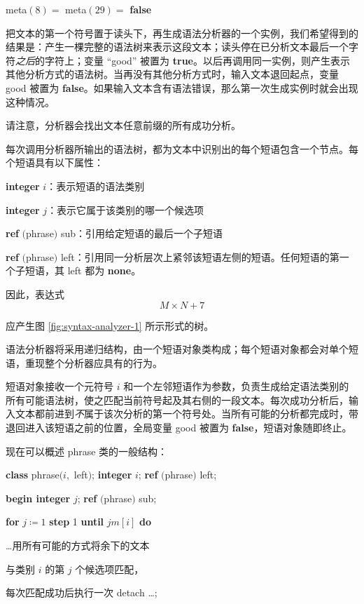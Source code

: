 \quad meta$(8) =$ meta$(29) =$ \textbf{false}

把文本的第一个符号置于读头下，再生成语法分析器的一个实例，我们希望得到的结果是：产生一棵完整的语法树来表示这段文本；读头停在已分析文本最后一个字符\textit{之后}的字符上；变量 ``good'' 被置为 \textbf{true}。以后再调用同一实例，则产生表示其他分析方式的语法树。当再没有其他分析方式时，输入文本退回起点，变量 good 被置为 \textbf{false}。如果输入文本含有语法错误，那么第一次生成实例时就会出现这种情况。

请注意，分析器会找出文本任意前缀的所有成功分析。

每次调用分析器所输出的语法树，都为文本中识别出的每个短语包含一个节点。每个短语具有以下属性：

\quad \textbf{integer} $i$：表示短语的语法类别

\quad \textbf{integer} $j$：表示它属于该类别的哪一个候选项

\quad \textbf{ref} $($phrase$)$ sub：引用给定短语的最后一个子短语

\parindent\quad \textbf{ref} $($phrase$)$ left：引用同一分析层次上紧邻该短语左侧的短语。任何短语的第一个子短语，其 left 都为 \textbf{none}。

\noindent
因此，表达式
$$
M\times N + 7
$$

\noindent
应产生图 \ref{fig:syntax-analyzer-1} 所示形式的树。

语法分析器将采用递归结构，由一个短语对象类构成；每个短语对象都会对单个短语，重现整个分析器应具有的行为。

短语对象接收一个元符号 $i$ 和一个左邻短语作为参数，负责生成给定语法类别的所有可能语法树，使之匹配当前符号起及其右侧的一段文本。每次成功分析后，输入文本都前进到\textit{不}属于该次分析的第一个符号处。当所有可能的分析都完成时，带退回进入该短语之前的位置，全局变量 good 被置为 \textbf{false}，短语对象随即终止。

现在可以概述 phrase 类的一般结构：

\quad \textbf{class} phrase$(i,$ left$)$; \textbf{integer} $i$; \textbf{ref} $($phrase$)$ left;

\quad \quad \textbf{begin integer} $j$; \textbf{ref} $($phrase$)$ sub;

\quad \quad \quad \textbf{for} $j\coloneq 1$ \textbf{step} 1 \textbf{until} $jm[i]$ \textbf{do}

\quad \quad \quad \quad \dots 用所有可能的方式将余下的文本

\quad \quad \quad \quad 与类别 $i$ 的第 $j$ 个候选项匹配，

\quad \quad \quad \quad 每次匹配成功后执行一次 detach \dots;

